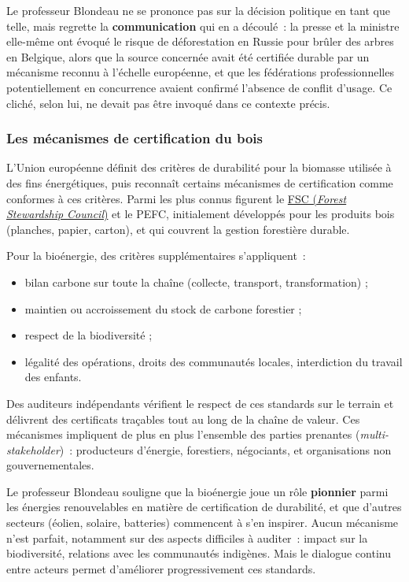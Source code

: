 Le professeur Blondeau ne se prononce pas sur la décision politique en tant que telle, mais regrette la \textbf{communication} qui en a découlé~: la presse et la ministre elle-même ont évoqué le risque de déforestation en Russie pour brûler des arbres en Belgique, alors que la source concernée avait été certifiée durable par un mécanisme reconnu à l'échelle européenne, et que les fédérations professionnelles potentiellement en concurrence avaient confirmé l'absence de conflit d'usage. Ce cliché, selon lui, ne devait pas être invoqué dans ce contexte précis.

\subsubsection{Les mécanismes de certification du bois}

L'Union européenne définit des critères de durabilité pour la biomasse utilisée à des fins énergétiques, puis reconnaît certains mécanismes de certification comme conformes à ces critères. Parmi les plus connus figurent le \href{https://www.fsc.be/fr-be/faq-01}{FSC (\textit{Forest Stewardship Council})} et le PEFC, initialement développés pour les produits bois (planches, papier, carton), et qui couvrent la gestion forestière durable.

Pour la bioénergie, des critères supplémentaires s'appliquent~:
\begin{itemize}
    \item bilan carbone sur toute la chaîne (collecte, transport, transformation) ;
    \item maintien ou accroissement du stock de carbone forestier ;
    \item respect de la biodiversité ;
    \item légalité des opérations, droits des communautés locales, interdiction du travail des enfants.
\end{itemize}

Des auditeurs indépendants vérifient le respect de ces standards sur le terrain et délivrent des certificats traçables tout au long de la chaîne de valeur. Ces mécanismes impliquent de plus en plus l'ensemble des parties prenantes (\textit{multi-stakeholder})~: producteurs d'énergie, forestiers, négociants, et organisations non gouvernementales.

Le professeur Blondeau souligne que la bioénergie joue un rôle \textbf{pionnier} parmi les énergies renouvelables en matière de certification de durabilité, et que d'autres secteurs (éolien, solaire, batteries) commencent à s'en inspirer. Aucun mécanisme n'est parfait, notamment sur des aspects difficiles à auditer~: impact sur la biodiversité, relations avec les communautés indigènes. Mais le dialogue continu entre acteurs permet d'améliorer progressivement ces standards.

